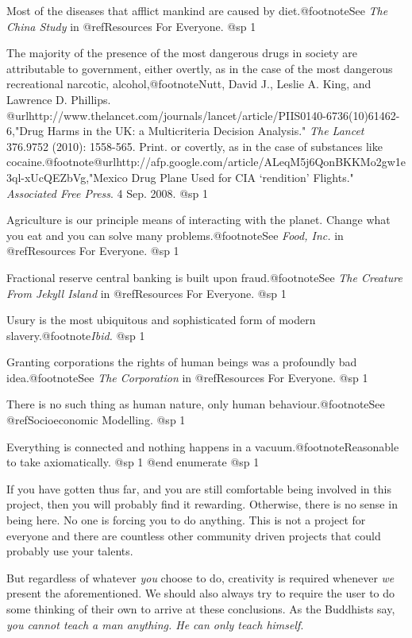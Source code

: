 \item
Most of the diseases that afflict mankind are caused by diet.@footnote{See {\sl The China Study} in @ref{Resources For Everyone}.}
@sp 1

\item
The majority of the presence of the most dangerous drugs in society are attributable to government, either overtly, as in the case of the most dangerous recreational narcotic, alcohol,@footnote{Nutt, David J., Leslie A. King, and Lawrence D. Phillips. @url{http://www.thelancet.com/journals/lancet/article/PIIS0140-6736(10)61462-6,"Drug Harms in the UK: a Multicriteria Decision Analysis."} {\sl The Lancet} 376.9752 (2010): 1558-565. Print.} or covertly, as in the case of substances like cocaine.@footnote{@url{http://afp.google.com/article/ALeqM5j6QonBKKMo2gw1e3ql-xUcQEZbVg,"Mexico Drug Plane Used for CIA ‘rendition’ Flights."} {\sl Associated Free Press}. 4 Sep. 2008.}
@sp 1

\item
Agriculture is our principle means of interacting with the planet. Change what you eat and you can solve many problems.@footnote{See {\sl Food, Inc.} in @ref{Resources For Everyone}.}
@sp 1

\item
Fractional reserve central banking is built upon fraud.@footnote{See {\sl The Creature From Jekyll Island} in @ref{Resources For Everyone}.}
@sp 1

\item
Usury is the most ubiquitous and sophisticated form of modern slavery.@footnote{{\sl Ibid.}}
@sp 1

\item
Granting corporations the rights of human beings was a profoundly bad idea.@footnote{See {\sl The Corporation} in @ref{Resources For Everyone}.}
@sp 1

\item
There is no such thing as human nature, only human behaviour.@footnote{See @ref{Socioeconomic Modelling}.}
@sp 1

\item
Everything is connected and nothing happens in a vacuum.@footnote{Reasonable to take axiomatically.}
@sp 1
@end enumerate
@sp 1

If you have gotten thus far, and you are still comfortable being involved in this project, then you will probably find it rewarding. Otherwise, there is no sense in being here. No one is forcing you to do anything. This is not a project for everyone and there are countless other community driven projects that could probably use your talents.

But regardless of whatever {\sl you} choose to do, creativity is required whenever {\sl we} present the aforementioned. We should also always try to require the user to do some thinking of their own to arrive at these conclusions. As the Buddhists say, {\sl you cannot teach a man anything. He can only teach himself}.

